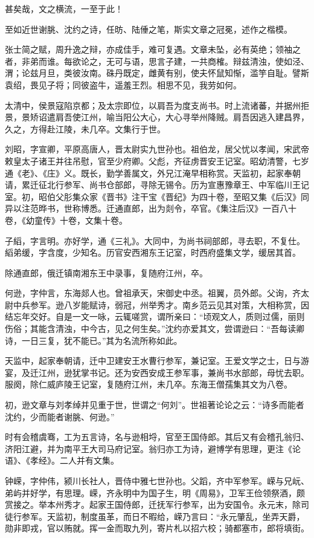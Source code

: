 \documentclass[12pt,UTF8]{ctexbook}
\begin{document}
甚矣哉，文之横流，一至于此！

至如近世谢朓、沈约之诗，任昉、陆倕之笔，斯实文章之冠冕，述作之楷模。

张士简之赋，周升逸之辩，亦成佳手，难可复遇。文章未坠，必有英绝；领袖之者，非弟而谁。每欲论之，无可与语，思言子建，一共商榷。辩兹清浊，使如泾、渭；论兹月旦，类彼汝南。硃丹既定，雌黄有别，使夫怀鼠知惭，滥竽自耻。譬斯袁绍，畏见子将；同彼盗牛，遥羞王烈。相思不见，我劳如何。

太清中，侯景寇陷京都；及太宗即位，以肩吾为度支尚书。时上流诸蕃，并据州拒景，景矫诏遣肩吾使江州，喻当阳公大心，大心寻举州降贼。肩吾因逃入建昌界，久之，方得赴江陵，未几卒。文集行于世。

刘昭，字宣卿，平原高唐人，晋太尉实九世孙也。祖伯龙，居父忧以孝闻，宋武帝敕皇太子诸王并往吊慰，官至少府卿。父彪，齐征虏晋安王记室。昭幼清警，七岁通《老》、《庄》义。既长，勤学善属文，外兄江淹早相称赏。天监初，起家奉朝请，累迁征北行参军、尚书仓部郎，寻除无锡令。历为宣惠豫章王、中军临川王记室。初，昭伯父肜集众家《晋书》注干宝《晋纪》为四十卷，至昭又集《后汉》同异以注范晔书，世称博悉。迁通直郎，出为剡令，卒官。《集注后汉》一百八十卷，《幼童传》十卷，文集十卷。

子縚，字言明。亦好学，通《三礼》。大同中，为尚书祠部郎，寻去职，不复仕。縚弟缓，字含度，少知名。历官安西湘东王记室，时西府盛集文学，缓居其首。

除通直郎，俄迁镇南湘东王中录事，复随府江州，卒。

何逊，字仲言，东海郯人也。曾祖承天，宋御史中丞。祖翼，员外郎。父询，齐太尉中兵参军。逊八岁能赋诗，弱冠，州举秀才。南乡范云见其对策，大相称赏，因结忘年交好。自是一文一咏，云辄嗟赏，谓所亲曰：“顷观文人，质则过儒，丽则伤俗；其能含清浊，中今古，见之何生矣。”沈约亦爱其文，尝谓逊曰：“吾每读卿诗，一日三复，犹不能已。”其为名流所称如此。

天监中，起家奉朝请，迁中卫建安王水曹行参军，兼记室。王爱文学之士，日与游宴，及迁江州，逊犹掌书记。还为安西安成王参军事，兼尚书水部郎，母忧去职。服阕，除仁威庐陵王记室，复随府江州，未几卒。东海王僧孺集其文为八卷。

初，逊文章与刘孝绰并见重于世，世谓之“何刘”。世祖著论论之云：“诗多而能者沈约，少而能者谢朓、何逊。”

时有会稽虞骞，工为五言诗，名与逊相埒，官至王国侍郎。其后又有会稽孔翁归、济阳江避，并为南平王大司马府记室。翁归亦工为诗，避博学有思理，更注《论语》、《孝经》。二人并有文集。

钟嵘，字仲伟，颍川长社人，晋侍中雅七世孙也。父蹈，齐中军参军。嵘与兄岏、弟屿并好学，有思理。嵘，齐永明中为国子生，明《周易》，卫军王俭领祭酒，颇赏接之。举本州秀才。起家王国侍郎，迁抚军行参军，出为安国令。永元末，除司徒行参军。天监初，制度虽革，而日不暇给，嵘乃言曰：“永元肇乱，坐弄天爵，勋非即戎，官以贿就。挥一金而取九列，寄片札以招六校；骑都塞市，郎将填街。
\end{document}
